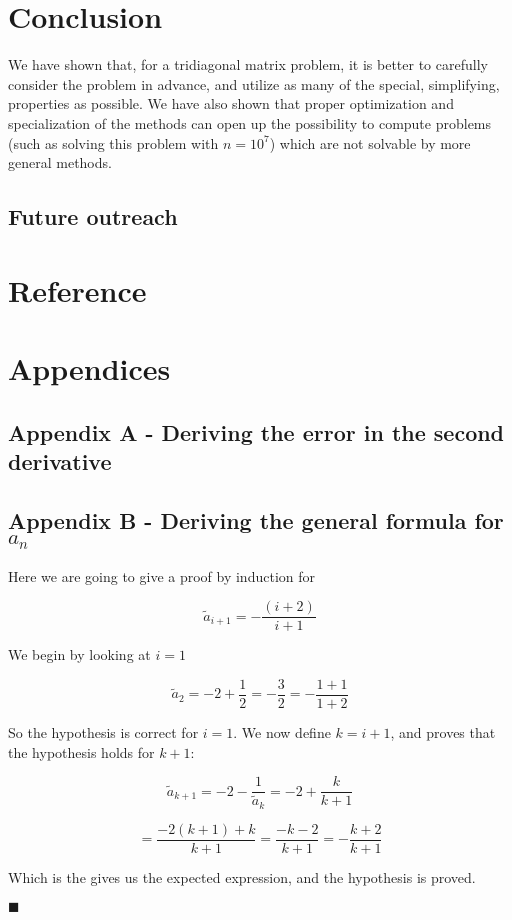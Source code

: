 \documentclass[a4paper, 10pt]{article}
\begin{document}
\section{Conclusion}
We have shown that, for a tridiagonal matrix problem, it is better to carefully consider the problem in advance, and utilize as many of the special, simplifying, properties as possible. We have also shown that proper optimization and specialization of the methods can open up the possibility to compute problems (such as solving this problem with $n=10^7$) which are not solvable by more general methods.
\subsection{Future outreach}

\section{Reference}
\section{Appendices}
\subsection{Appendix A - Deriving the error in the second derivative}
\subsection{Appendix B - Deriving the general formula for $a_n$}





Here we are going to give a proof by induction for 

$$
\tilde{a}_{i+1}=-\frac{(i+2)}{i+1}
$$


We begin by looking at $i=1$

$$
\tilde{a}_{2} = -2 + \frac{1}{2} = -\frac{3}{2} = -\frac{1+1}{1+2}
$$

So the hypothesis is correct for $i = 1$. We now define $k = i+1$, and proves that the hypothesis holds for $k+1$:

$$
\tilde{a}_{k+1} = -2 - \frac{1}{\tilde{a}_{k}} = -2 + \frac{k}{k+1}
$$

$$
= \frac{-2(k+1) + k}{k+1} = \frac{-k - 2}{k+1} = -\frac{k+2}{k+1}
$$

Which is the gives us the expected expression, and the hypothesis is proved.


\hfill $\blacksquare$
\end{document}
